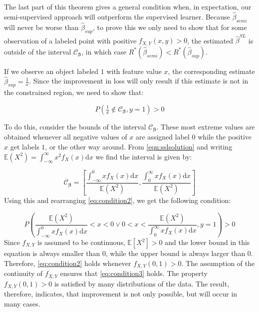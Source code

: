 \documentclass[smallcondensed]{svjour3}
\begin{document}
The last part of this theorem gives a general condition when, in expectation, our semi-supervised approach will outperform the supervised learner. Because $\hat{\beta}_{semi}$ will never be worse than $\hat{\beta}_{sup}$, to prove this we only need to show that for some observation of a labeled point with positive $f_{X,Y}(x,y)>0$, the estimated $\hat{\beta}^{SL}$ is outside of the interval $\mathcal{C}_{\boldsymbol{\beta}}$, in which case $R^*(\hat{\beta}_{semi}) < R^*(\hat{\beta}_{sup})$. 

If we observe an object labeled $1$ with feature value $x$, the corresponding estimate $\hat{\beta}_{sup}=\tfrac{1}{x}$. Since the improvement in loss will only result if this estimate is not in the constrained region, we need to show that:

\begin{equation} \label{eq:condition}
P(\tfrac{1}{x} \notin \mathcal{C}_{\boldsymbol{\beta}},y=1)>0
\end{equation}

To do this, consider the bounds of the interval $\mathcal{C}_{\boldsymbol{\beta}}$. These most extreme values are obtained whenever all negative values of $x$ are assigned label $0$ while the positive $x$ get labels $1$, or the other way around. From \eqref{eqn:sslsolution} and writing $\mathbb{E}(X^2)=\int_{-\infty}^{\infty} { x^2 f_X(x) \mathrm{d}x}$ we find the interval is given by:  

\begin{equation} \label{eq:condition2}
\mathcal{C}_{\boldsymbol{\beta}}=\left[ \frac{\int_{-\infty}^{0}{x f_X(x) \mathrm{d}x }}{\mathbb{E}(X^2)},\frac{\int_{0}^{\infty}{x f_X(x)  \mathrm{d}x }}{\mathbb{E}(X^2)} \right]
\end{equation}
Using this and rearranging \eqref{eq:condition2}, we get the following condition:

\begin{equation} \label{eq:condition3}
P \left( \frac{\mathbb{E}(X^2)}{\int_{-\infty}^{0}{x f_X(x)  \mathrm{d}x }} < x < 0 \vee 0 < x < \frac{\mathbb{E}(X^2)}{\int_{0}^{\infty}{x f_X(x)  \mathrm{d}x }},y=1 \right) > 0
\end{equation}
Since $f_{X,Y}$ is assumed to be continuous, $\mathbb{E}[X^2]>0$ and the lower bound in this equation is always smaller than $0$, while the upper bound is always larger than $0$.  Therefore, \eqref{eq:condition2} holds whenever $f_{X,Y}(0,1)>0$. The assumption of the continuity of $f_{X,Y}$ ensures that  \eqref{eq:condition3} holds.  The property $f_{X,Y}(0,1)>0$ is satisfied by many distributions of the data. The result, therefore, indicates, that improvement is not only possible, but will occur in many cases. 
\end{document}

